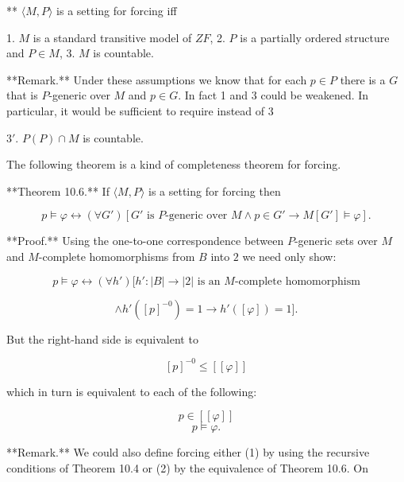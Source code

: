 ** $\langle M, P \rangle$ is a setting for forcing iff

1. $M$ is a standard transitive model of $ZF$,
2. $P$ is a partially ordered structure and $P \in M$,
3. $M$ is countable.

**Remark.** Under these assumptions we know that for each $p \in P$ there is a $G$ that is $P$-generic over $M$ and $p \in G$. In fact 1 and 3 could be weakened. In particular, it would be sufficient to require instead of 3

$3'$. $P(P) \cap M$ is countable.

The following theorem is a kind of completeness theorem for forcing.

**Theorem 10.6.** If $\langle M, P \rangle$ is a setting for forcing then

$$p \models \varphi \leftrightarrow (\forall G')[G' \text{ is } P\text{-generic over } M \wedge p \in G' \rightarrow M[G'] \models \varphi].$$

**Proof.** Using the one-to-one correspondence between $P$-generic sets over $M$ and $M$-complete homomorphisms from $B$ into $2$ we need only show:

$$p \models \varphi \leftrightarrow (\forall h')[h' : |B| \rightarrow |2| \text{ is an } M\text{-complete homomorphism}$$

$$\wedge h'([p]^{-0}) = 1 \rightarrow h'([\varphi]) = 1].$$

But the right-hand side is equivalent to

$$[p]^{-0} \leq [[\varphi]]$$

which in turn is equivalent to each of the following:

$$p \in [[\varphi]]$$
$$p \models \varphi.$$

**Remark.** We could also define forcing either (1) by using the recursive conditions of Theorem 10.4 or (2) by the equivalence of Theorem 10.6. On
